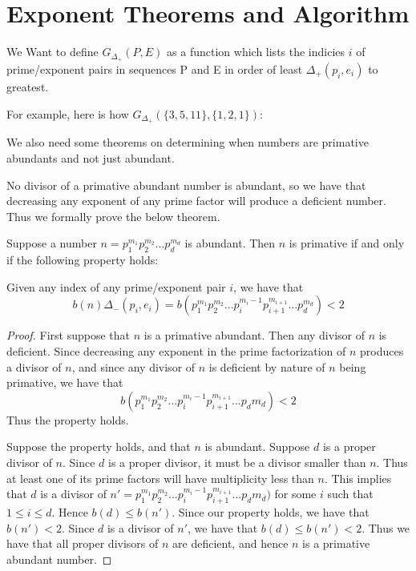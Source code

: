 \documentclass[../paper.tex]{subfiles}
\begin{document}
\section{Exponent Theorems and Algorithm}

We Want to define $G_{\Delta_{+}}(P,E)$ as a function which lists
the indicies $i$ of prime/exponent pairs in sequences P and E
in order of least $\Delta_{+}(p_i, e_i)$ to greatest.

For example, here is how $G_{\Delta_{+}}(\{3,5,11\}, \{1,2,1\})$:

We also need some theorems on determining when numbers are 
primative abundants and not just abundant.

No divisor of a primative abundant number is abundant, so 
we have that decreasing any exponent of any prime factor will
produce a deficient number. Thus we formally prove the below
theorem.

\begin{theorem}
Suppose a number $n = p_1^{m_1} p_2^{m_2} ... p_d^{m_d}$ is 
abundant. Then $n$ is primative if and only if the 
following property holds:

Given any index of any prime/exponent pair $i$, we have that
$$b(n) \Delta_{-}(p_i, e_i) = b(p_1^{m_1} p_2^{m_2} ...  
p_i^{m_i - 1} p_{i+1}^{m_{i+1}}... p_d^{m_d}) < 2$$
\end{theorem}

\begin{proof}
	First suppose that $n$ is a primative abundant. Then any divisor of $n$
is deficient. Since decreasing any exponent in the prime 
factorization of $n$ produces a divisor of $n$, and since any
divisor of $n$ is deficient by nature of $n$ being primative,
we have that 
$$b(p_1^{m_1} p_2^{m_2} ...   p_i^{m_i - 1} p_{i+1}^{m_{i+1}}
... p_d{m_d}) < 2$$
Thus the property holds.

	Suppose the property holds, and that $n$ is abundant. Suppose $d$
is a proper divisor of $n$. Since $d$ is a proper divisor, it must
be a divisor smaller than $n$. Thus at least one of its prime factors
will have multiplicity less than $n$. This implies that $d$ is a 
divisor of
$n' = p_1^{m_1} p_2^{m_2} ...   p_i^{m_i - 1} p_{i+1}^{m_{i+1}}
... p_d{m_d})$ 
for some $i$ such that $1 \leq i \leq d$. Hence $b(d) \leq b(n')$.
Since our property holds, we have that $b(n') < 2$. Since $d$ is
a divisor of $n'$, we have that $b(d) \leq b(n') < 2$. Thus we
have that all proper divisors of $n$ are deficient, and hence $n$ is 
a primative abundant number.
\end{proof}
\end{document}
